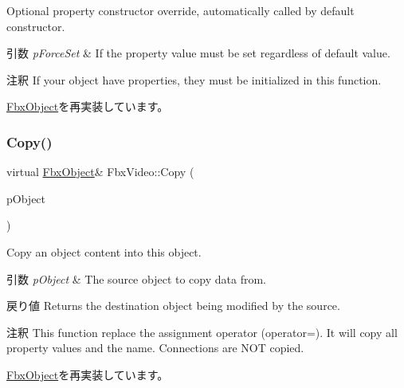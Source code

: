 Optional property constructor override, automatically called by default constructor. 
\begin{DoxyParams}{引数}
{\em p\+Force\+Set} & If the property value must be set regardless of default value. \\
\hline
\end{DoxyParams}
\begin{DoxyRemark}{注釈}
If your object have properties, they must be initialized in this function. 
\end{DoxyRemark}


\hyperlink{class_fbx_object_ad44f814323dc1b5e78bff1bfc608b4bb}{Fbx\+Object}を再実装しています。

\mbox{\label{class_fbx_video_aafd075b5cd4710be1e3f14cd0ede1bce}} 
\subsubsection{\texorpdfstring{Copy()}{Copy()}}
{\footnotesize\ttfamily virtual \hyperlink{class_fbx_object}{Fbx\+Object}\& Fbx\+Video\+::\+Copy (\begin{DoxyParamCaption}\item[{const \hyperlink{class_fbx_object}{Fbx\+Object} \&}]{p\+Object }\end{DoxyParamCaption})\hspace{0.3cm}{\ttfamily [virtual]}}

Copy an object content into this object. 
\begin{DoxyParams}{引数}
{\em p\+Object} & The source object to copy data from. \\
\hline
\end{DoxyParams}
\begin{DoxyReturn}{戻り値}
Returns the destination object being modified by the source. 
\end{DoxyReturn}
\begin{DoxyRemark}{注釈}
This function replace the assignment operator (operator=). It will copy all property values and the name. Connections are N\+OT copied. 
\end{DoxyRemark}


\hyperlink{class_fbx_object_a0c0c5adb38284d14bb82c04d54504a3e}{Fbx\+Object}を再実装しています。

\mbox{\label{class_fbx_video_af03167bd6b840efe8425017fb7a606e3}} 
